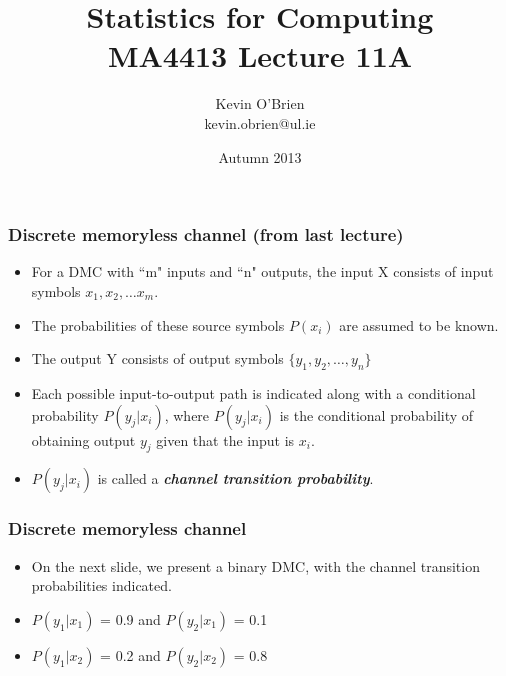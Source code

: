 \documentclass[a4]{beamer}
\title[MA4413]{Statistics for Computing \\ {\normalsize MA4413 Lecture 11A}}
\author[Kevin O'Brien]{Kevin O'Brien \\ {\scriptsize kevin.obrien@ul.ie}}
\date{Autumn 2013}
\institute[Maths \& Stats]{Dept. of Mathematics \& Statistics, \\ University \textit{of} Limerick}
\begin{document}
\begin{frame}
\titlepage
\end{frame}

\begin{frame}
\frametitle{Discrete memoryless channel (from last lecture)}
\begin{itemize}
\item For a DMC with ``m" inputs and ``n" outputs, the input X consists of input symbols $x_1, x_2, \ldots x_m$.
\item The probabilities of these source symbols $P(x_i)$ are assumed to be known.
\item The output Y consists of output symbols $\{y_1,y_2,\ldots, y_n \}$
\item Each possible input-to-output path is indicated along with a conditional probability $P(y_j|x_i)$, where $P(y_j|x_i)$  is the conditional probability of
obtaining output $y_j$ given that the input is $x_i$. \item $P(y_j|x_i)$ is called a \textbf{\emph{channel transition probability}}.
\end{itemize}
\end{frame}
\begin{frame}
\frametitle{Discrete memoryless channel}
\vspace{-1cm}
\begin{itemize}
\item On the next slide, we present a binary DMC, with the channel transition probabilities indicated.
\item $P(y_1|x_1)$ = 0.9  and $P(y_2|x_1)$ = 0.1
\item $P(y_1|x_2)$ = 0.2  and $P(y_2|x_2)$ = 0.8
\end{itemize}
\end{frame}
\end{document}
